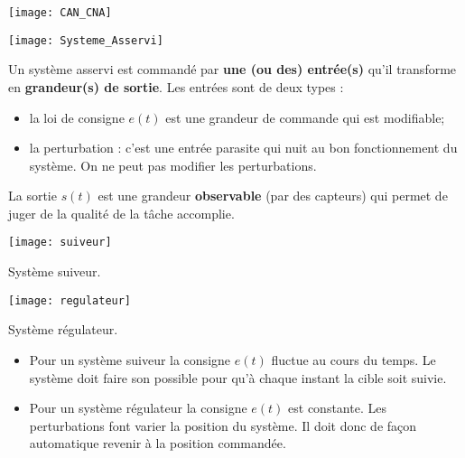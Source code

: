 \begin{center}
\texttt{[image: CAN\_CNA]}
\end{center}

\begin{marginfigure}[1cm]
\texttt{[image: Systeme\_Asservi]}
\end{marginfigure}


\begin{defi}

Un système asservi est commandé par \textbf{une (ou des) entrée(s)} qu'il
transforme en \textbf{grandeur(s) de sortie}.
Les entrées sont de deux types : 
\begin{itemize}
\item la loi de consigne $e(t)$ est une grandeur de commande qui est modifiable;
\item la perturbation : c'est une entrée parasite qui nuit au bon
fonctionnement du système. On ne peut pas modifier les perturbations.
\end{itemize}

La sortie $s(t)$ est une grandeur \textbf{observable} (par des capteurs) qui
permet de juger de la qualité de la tâche accomplie.
\end{defi} 

\vspace{.1cm}

\begin{marginfigure}
\texttt{[image: suiveur]}
\caption{Système suiveur.}
\end{marginfigure}

\begin{marginfigure}
\texttt{[image: regulateur]}
\caption{Système régulateur.}
\end{marginfigure}

\begin{defi}
\begin{itemize}
\item Pour un système suiveur la consigne $e(t)$ fluctue au cours du temps. Le système doit faire son possible pour qu'à chaque instant la cible soit suivie.
\item Pour un système régulateur la consigne $e(t)$ est constante. Les perturbations font varier la position du système. Il doit donc de façon automatique revenir à la position commandée.
\end{itemize}
\end{defi}

